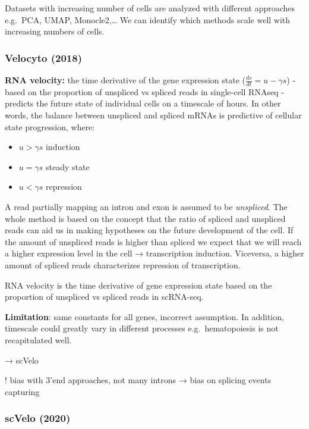 Datasets with increasing number of cells are analyzed with different
approaches e.g.~PCA, UMAP, Monocle2,\ldots{} We can identify which
methods scale well with increasing numbers of cells.

\hypertarget{velocyto-2018}{%
\subsubsection{Velocyto (2018)}\label{velocyto-2018}}

\textbf{RNA velocity:} the time derivative of the gene expression state
(\(\frac{ds}{dt}=u- \gamma s\)) - based on the proportion of unspliced
vs spliced reads in single-cell RNAseq - predicts the future state of
individual cells on a timescale of hours. In other words, the balance
between unspliced and spliced mRNAs is predictive of cellular state
progression, where:

\begin{itemize}
\tightlist
\item
  \(u > \gamma s\) induction
\item
  \(u = \gamma s\) steady state
\item
  \(u < \gamma s\) repression
\end{itemize}

A read partially mapping an intron and exon is assumed to be
\emph{unspliced}. The whole method is based on the concept that the
ratio of spliced and unspliced reads can aid us in making hypotheses on
the future development of the cell. If the amount of unspliced reads is
higher than spliced we expect that we will reach a higher expression
level in the cell → transcription induction. Viceversa, a higher amount
of spliced reads characterizes repression of transcription.

RNA velocity is the time derivative of gene expression state based on
the proportion of unspliced vs spliced reads in scRNA-seq.

\textbf{Limitation}: same constants for all genes, incorrect assumption.
In addition, timescale could greatly vary in different processes
e.g.~hematopoiesis is not recapitulated well.

→ scVelo

! bias with 3'end approaches, not many introns → bias on splicing events
capturing

\hypertarget{scvelo-2020}{%
\subsubsection{scVelo (2020)}\label{scvelo-2020}}

